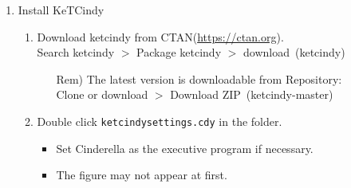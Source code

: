 \documentclass{article}
\begin{document}
\begin{enumerate}[\bf\large 1.]
\item Install KeTCindy
  \begin{enumerate}[(1)]
  \item Download ketcindy from CTAN(\url{https://ctan.org}).\\
  \hspace*{10mm}Search ketcindy $>$ Pack­age ketcindy $>$ download\ (ketcindy)
    \begin{itemize}
    \item[Rem)]The latest version is downloadable from Repository:\\
         \hspace*{5mm}Clone or download $>$ Download ZIP\ (ketcindy-master)
    \end{itemize}
  \item Double click \verb|ketcindysettings.cdy| in the folder.
    \begin{itemize}
    \item Set Cinderella as the executive program if necessary.
   \item The figure may not appear at first.
   \end{itemize}

\vspace{2mm}


\end{enumerate}
\end{enumerate}
\end{document}

